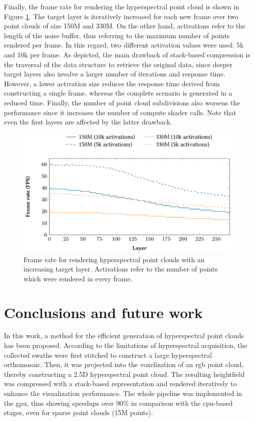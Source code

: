 Finally, the frame rate for rendering the hyperspectral point cloud is shown in Figure \ref{fig:hyper_fps_performance}. The target layer is iteratively increased for each new frame over two point clouds of size 150M and 330M. On the other hand, activations refer to the length of the noise buffer, thus referring to the maximum number of points rendered per frame. In this regard, two different activation values were used: 5k and 10k per frame. As depicted, the main drawback of stack-based compression is the traversal of the data structure to retrieve the original data, since deeper target layers also involve a larger number of iterations and response time. However, a lower activation size reduces the response time derived from constructing a single frame, whereas the complete scenario is generated in a reduced time. Finally, the number of point cloud subdivisions also worsens the performance since it increases the number of compute shader calls. Note that even the first layers are affected by the latter drawback. 

\begin{figure}[bt]
    \centering
    \includegraphics[width=\linewidth]{figs/hyper_point_cloud/hyper_fps_results.png}
	\caption{Frame rate for rendering hyperspectral point clouds with an increasing target layer. Activations refer to the number of points which were rendered in every frame. }
	\label{fig:hyper_fps_performance}
\end{figure}

\section{Conclusions and future work}

In this work, a method for the efficient generation of hyperspectral point clouds has been proposed. According to the limitations of hyperspectral acquisition, the collected swaths were first stitched to construct a large hyperspectral orthomosaic. Then, it was projected into the voxelization of an \acrshort{rgb} point cloud, thereby constructing a 2.5D hyperspectral point cloud. The resulting heightfield was compressed with a stack-based representation and rendered iteratively to enhance the visualization performance. The whole pipeline was implemented in the \acrshort{gpu}, thus showing speedups over 90\% in comparison with the \acrshort{cpu}-based stages, even for sparse point clouds (15M points).

